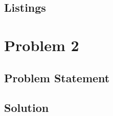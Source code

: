 \documentclass[12pt,a4paper,titlepage,oneside]{article}
\begin{document}
\subsection{Listings}

\newpage
\section{Problem 2}

\subsection{Problem Statement}


\subsection{Solution}
\end{document}
